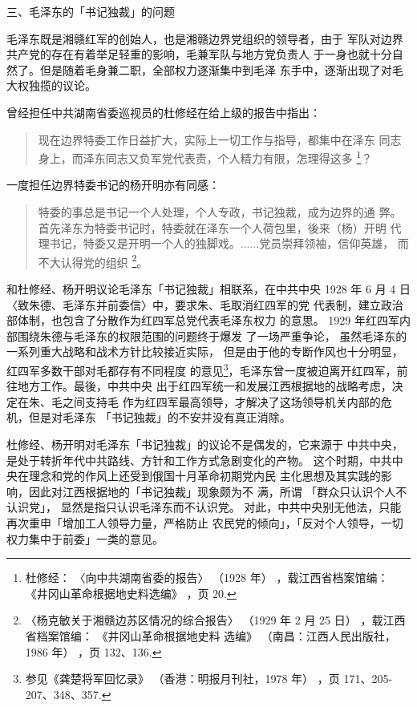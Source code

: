 三、毛泽东的「书记独裁」的问题

毛泽东既是湘赣红军的创始人，也是湘赣边界党组织的领导者，由于
军队对边界共产党的存在有着举足轻重的影响，毛兼军队与地方党负责人
于一身也就十分自然了。但是随着毛身兼二职，全部权力逐渐集中到毛泽
东手中，逐渐出现了对毛大权独揽的议论。

曾经担任中共湖南省委巡视员的杜修经在给上级的报告中指出：
\begin{quote}
	\fzwkai 现在边界特委工作日益扩大，实际上一切工作与指导，都集中在泽东
同志身上，而泽东同志又负军党代表责，个人精力有限，怎理得这多
\footnote{ 杜修经：
〈向中共湖南省委的报告〉
（1928 年）
，载江西省档案馆编：
《井冈山革命根据地史料选编》
，页 20.}？
\end{quote}

一度担任边界特委书记的杨开明亦有同感：
\begin{quote}
	\fzwkai 特委的事总是书记一个人处理，个人专政，书记独裁，成为边界的通
弊。首先泽东为特委书记时，特委就在泽东一个人荷包里，後来（杨）开明
代理书记，特委又是开明一个人的独脚戏。......党员崇拜领袖，信仰英雄，
而不大认得党的组织
\footnote{ 〈杨克敏关于湘赣边苏区情况的综合报告〉
（1929 年 2 月 25 日）
，载江西省档案馆编：
《井冈山革命根据地史料
选编》
（南昌：江西人民出版社，1986 年）
，页 132、136.}。
\end{quote}

和杜修经、杨开明议论毛泽东「书记独裁」相联系，在中共中央 1928
年 6 月 4 日〈致朱德、毛泽东并前委信〉中，要求朱、毛取消红四军的党
代表制，建立政治部体制，也包含了分散作为红四军总党代表毛泽东权力
的意思。
1929 年红四军内部围绕朱德与毛泽东的权限范围的问题终于爆发
了一场严重争论，
虽然毛泽东的一系列重大战略和战术方针比较接近实际，
但是由于他的专断作风也十分明显，红四军多数干部对毛都存有不同程度
的意见\footnote{ 参见《龚楚将军回忆录》
（香港：明报月刊社，1978 年）
，页 171、205-207、348、357.}，毛泽东曾一度被迫离开红四军，前往地方工作。最後，中共中央
出于红四军统一和发展江西根据地的战略考虑，决定在朱、毛之间支持毛
作为红四军最高领导，才解决了这场领导机关内部的危机，但是对毛泽东
「书记独裁」的不安并没有真正消除。

杜修经、杨开明对毛泽东「书记独裁」的议论不是偶发的，它来源于
中共中央，是处于转折年代中共路线、方针和工作方式急剧变化的产物。
这个时期，中共中央在理念和党的作风上还受到俄国十月革命初期党内民
主化思想及其实践的影响，因此对江西根据地的「书记独裁」现象颇为不
满，所谓
 「群众只认识个人不认识党」， 显然是指只认识毛泽东而不认识党。
对此，中共中央别无他法，只能再次重申「增加工人领导力量，严格防止
农民党的倾向」，「反对个人领导，一切权力集中于前委」一类的意见。

